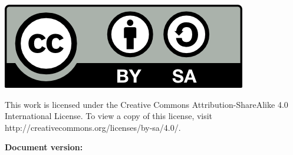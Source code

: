 \documentclass[a4paper,oneside,12pt]{report}
\begin{document}
\pagestyle{empty} %




\tableofcontents
\pagestyle{plain} %






\renewcommand{\chaptername}{} %



\clearpage
\begin{minipage}[c]{0.25\textwidth}
	\includegraphics[width=\textwidth]{./Figures/by-sa}
\end{minipage}
\begin{minipage}[c]{0.7\textwidth}
	This work is licensed under the Creative Commons Attribution-ShareAlike 4.0 International License. To view a copy of this license, visit http://creativecommons.org/licenses/by-sa/4.0/.
\end{minipage}

\vfill
\begin{center}
	\textbf{Document version: \vhCurrentVersion}
\end{center}



\appendix




\end{document}
